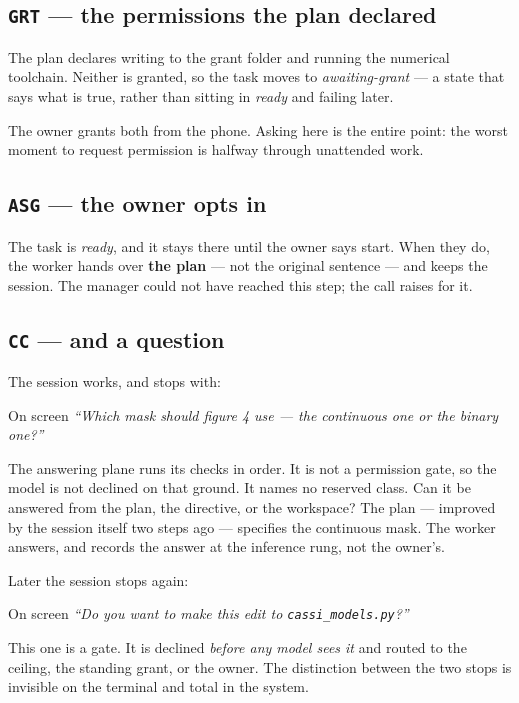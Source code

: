 \documentclass[11pt]{article}
\newcommand{\code}[1]{\texttt{\small #1}}
\begin{document}
\subsection{\code{GRT} --- the permissions the plan declared}

The plan declares writing to the grant folder and running the numerical toolchain. Neither is granted, so the task moves to \emph{awaiting-grant} --- a state that says what is true, rather than sitting in \emph{ready} and failing later.

The owner grants both from the phone. Asking here is the entire point: the worst moment to request permission is halfway through unattended work.

\subsection{\code{ASG} --- the owner opts in}

The task is \emph{ready}, and it stays there until the owner says start. When they do, the worker hands over \textbf{the plan} --- not the original sentence --- and keeps the session. The manager could not have reached this step; the call raises for it.

\subsection{\code{CC} --- and a question}

The session works, and stops with:

\begin{specbox}{On screen}
\emph{``Which mask should figure 4 use --- the continuous one or the binary one?''}
\end{specbox}

The answering plane runs its checks in order. It is not a permission gate, so the model is not declined on that ground. It names no reserved class. Can it be answered from the plan, the directive, or the workspace? The plan --- improved by the session itself two steps ago --- specifies the continuous mask. The worker answers, and records the answer at the inference rung, not the owner's.

Later the session stops again:

\begin{specbox}{On screen}
\emph{``Do you want to make this edit to \code{cassi\_models.py}?''}
\end{specbox}

This one is a gate. It is declined \emph{before any model sees it} and routed to the ceiling, the standing grant, or the owner. The distinction between the two stops is invisible on the terminal and total in the system.
\end{document}

